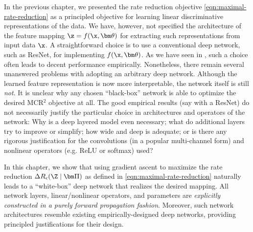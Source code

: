 \documentclass[../../book-main.tex]{subfiles}
\begin{document}
In the previous chapter, we presented the rate reduction objective \eqref{eqn:maximal-rate-reduction} as a principled objective for learning linear discriminative representations of the data. We have, however, not specified the architecture of the feature mapping $\z = f(\x, \bm \theta)$ for extracting such representations from input data $\x$. 
A straightforward choice is to use a conventional deep network, such as ResNet, for implementing $f(\x, \bm \theta)$. As we have seen in  , such a choice often leads to decent performance empirically. Nonetheless, there remain several unanswered problems with adopting an arbitrary deep network. Although the learned feature representation is now more interpretable, the network itself is still {\em not}. It is unclear why any chosen ``black-box'' network is able to optimize the desired MCR$^2$ objective at all. The good empirical results (say with a ResNet) do not necessarily justify the particular choice in architectures and operators of the network: Why is a deep layered model even necessary; what do additional layers try to improve or simplify; how wide and deep is adequate; or is there any rigorous justification for the convolutions (in a popular multi-channel form) and nonlinear operators (e.g. ReLU or softmax) used? 

In this chapter, we show that using gradient ascent to maximize the rate reduction $\Delta R_{\epsilon}(\Z \mid \bm \Pi)$ as defined in \eqref{eqn:maximal-rate-reduction} naturally leads to a ``white-box'' deep network that realizes the desired mapping. All network layers, linear/nonlinear operators, and parameters are {\em explicitly constructed in a purely forward propagation fashion}. Moreover, such network architectures resemble existing empirically-designed deep networks, providing principled justifications for their design.
\end{document}
